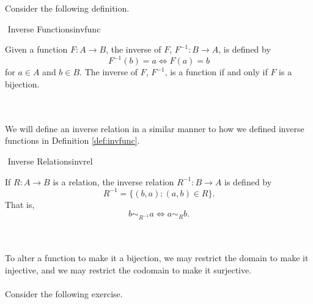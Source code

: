         \vphantom
        \\
        \\
        Consider the following definition.
        \begin{definition}{\Stop\,\,Inverse Functions}{invfunc}
        
            Given a function \(F:A\to B\), the inverse of \(F\), \(F^{-1}:B\to A\), is defined by
            \begin{equation*}
                F^{-1}(b)=a\iff F(a)=b
            \end{equation*}
            for \(a\in A\) and \(b\in B\). The inverse of \(F\), \(F^{-1}\), is a function if and only if \(F\) is a bijection.
        \end{definition}
        \vphantom
        \\
        \\
        We will define an inverse relation in a similar manner to how we defined inverse functions in Definition \ref{def:invfunc}.
        \begin{definition}{\Stop\,\,Inverse Relations}{invrel}
            
            If \(R:A\to B\) is a relation, the inverse relation \(R^{-1}:B\to A\) is defined by 
            \begin{equation*}
                R^{-1}=\{(b,a):(a,b)\in R\}.
            \end{equation*}
            That is,
            \begin{equation*}
                b\sim_{R^{-1}}a\iff a\sim_Rb.
            \end{equation*}
            
        \end{definition}
        \vphantom
        \\
        \\
        To alter a function to make it a bijection, we may restrict the domain to make it injective, and we may restrict the codomain to make it surjective.
        \pagebreak
        \vphantom
        \\
        \\
        Consider the following exercise.

